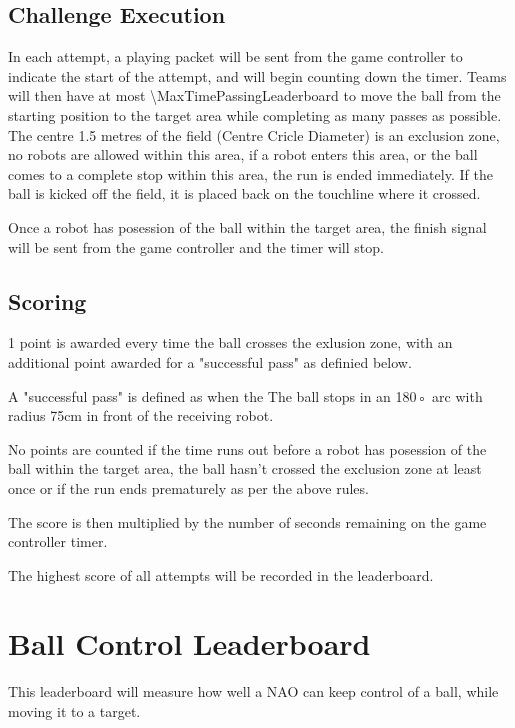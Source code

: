 \subsection{Challenge Execution}
In each attempt, a playing packet will be sent from the game controller to indicate the start of the attempt,
and will begin counting down the timer.
Teams will then have at most \qty{\MaxTimePassingLeaderboard}{\sec} to move the ball from the starting
position to the target area while completing as many passes as possible. The centre
1.5 metres of the field (Centre Cricle Diameter) is an exclusion zone, no robots are allowed within this area,
if a robot enters this area, or the ball comes to a complete stop
within this area, the run is ended immediately. If the ball is kicked off the field,
it is placed back on the touchline where it crossed.

Once a robot has posession of the ball within the target area, the finish signal will be sent
from the game controller and the timer will stop.


\subsection{Scoring}
1 point is awarded every time the ball crosses the exlusion zone,
with an additional point awarded for a "successful pass" as definied below.

A "successful pass" is defined as when the
The ball stops in an 180◦ arc with radius 75cm in front of the receiving robot.

No points are counted if the time runs out before a robot has posession of the ball
within the target area, the ball hasn't crossed the exclusion zone at least once
or if the run ends prematurely as per the above rules.

The score is then multiplied by the number of seconds remaining on the game controller timer.

The highest score of all attempts will be recorded in the leaderboard.

\section{Ball Control Leaderboard}
This leaderboard will measure how well a NAO can keep control of a ball, while moving it
to a target.

